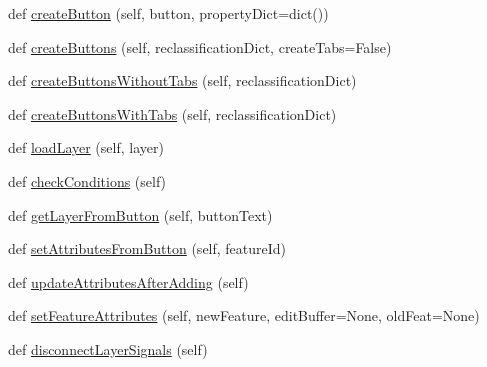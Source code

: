 \begin{DoxyCompactItemize}
def \mbox{\hyperlink{class_dsg_tools_1_1_production_tools_1_1_field_tool_box_1_1field__toolbox_1_1_field_toolbox_a0a2d77a158704eb6902759a909b06546}{create\+Button}} (self, button, property\+Dict=dict())
\item 
def \mbox{\hyperlink{class_dsg_tools_1_1_production_tools_1_1_field_tool_box_1_1field__toolbox_1_1_field_toolbox_a36afd5d534e8f34243ca0fd2461e75b0}{create\+Buttons}} (self, reclassification\+Dict, create\+Tabs=False)
\item 
def \mbox{\hyperlink{class_dsg_tools_1_1_production_tools_1_1_field_tool_box_1_1field__toolbox_1_1_field_toolbox_a5feea2b516215abe47448667836e1211}{create\+Buttons\+Without\+Tabs}} (self, reclassification\+Dict)
\item 
def \mbox{\hyperlink{class_dsg_tools_1_1_production_tools_1_1_field_tool_box_1_1field__toolbox_1_1_field_toolbox_a889ff53bda2fc377700f108eef3a6cb6}{create\+Buttons\+With\+Tabs}} (self, reclassification\+Dict)
\item 
def \mbox{\hyperlink{class_dsg_tools_1_1_production_tools_1_1_field_tool_box_1_1field__toolbox_1_1_field_toolbox_a8a4fc2d32d5aa1acf49e0cd15a4eedfc}{load\+Layer}} (self, layer)
\item 
def \mbox{\hyperlink{class_dsg_tools_1_1_production_tools_1_1_field_tool_box_1_1field__toolbox_1_1_field_toolbox_a19f0de63a76b240ecb670e16be5cc39e}{check\+Conditions}} (self)
\item 
def \mbox{\hyperlink{class_dsg_tools_1_1_production_tools_1_1_field_tool_box_1_1field__toolbox_1_1_field_toolbox_a4f022107f1891fb44f5f5b25bc4e426a}{get\+Layer\+From\+Button}} (self, button\+Text)
\item 
def \mbox{\hyperlink{class_dsg_tools_1_1_production_tools_1_1_field_tool_box_1_1field__toolbox_1_1_field_toolbox_a9a87b00d3a76bc0c7bce6f0c27b508df}{set\+Attributes\+From\+Button}} (self, feature\+Id)
\item 
def \mbox{\hyperlink{class_dsg_tools_1_1_production_tools_1_1_field_tool_box_1_1field__toolbox_1_1_field_toolbox_a34c6f8bc997fd96fffcdf9ee5ed9f94b}{update\+Attributes\+After\+Adding}} (self)
\item 
def \mbox{\hyperlink{class_dsg_tools_1_1_production_tools_1_1_field_tool_box_1_1field__toolbox_1_1_field_toolbox_a7ab94771efb094f3d331a9689c3af017}{set\+Feature\+Attributes}} (self, new\+Feature, edit\+Buffer=None, old\+Feat=None)
\item 
def \mbox{\hyperlink{class_dsg_tools_1_1_production_tools_1_1_field_tool_box_1_1field__toolbox_1_1_field_toolbox_a3b496b3d89e2edda903714b1485a50d4}{disconnect\+Layer\+Signals}} (self)

\end{DoxyCompactItemize}
